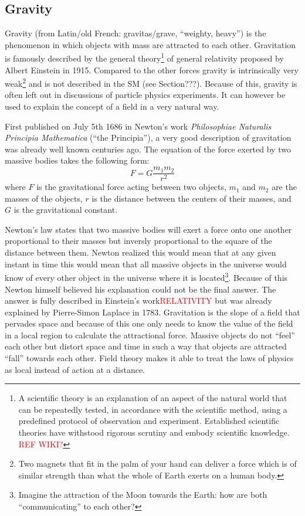 \subsection*{Gravity}
Gravity (from Latin/old French: gravitas/grave, ``weighty, heavy'') is the phenomenon in which objects with mass are attracted to each other. Gravitation is famously described by the general theory\footnote{A scientific theory is an explanation of an aspect of the natural world that can be repeatedly tested, in accordance with the scientific method, using a predefined protocol of observation and experiment. Established scientific theories have withstood rigorous scrutiny and embody scientific knowledge. \textcolor{red}{REF WIKI?}} of general relativity proposed by Albert Einstein in 1915. Compared to the other forces gravity is intrinsically very weak\footnote{Two magnets that fit in the palm of your hand can deliver a force which is of similar strength than what the whole of Earth exerts on a human body.} and is not described in the SM (see Section???). Because of this, gravity is often left out in discussions of particle physics experiments. It can however be used to explain the concept of a field in a very natural way.

First published on July 5th 1686 in Newton's work \textit{Philosophiae Naturalis Principia Mathematica} (``the Principia''), a very good description of gravitation was already well known centuries ago. The equation of the force exerted by two massive bodies takes the following form:
\begin{equation}
F = G \frac{m_1 m_2}{r^2}
\end{equation}
where $F$ is the gravitational force acting between two objects, $m_1$ and $m_2$ are the masses of the objects, $r$ is the distance between the centers of their masses, and $G$ is the gravitational constant.

Newton's law states that two massive bodies will exert a force onto one another proportional to their masses but inversly proportional to the square of the distance between them. Newton realized this would mean that at any given instant in time this would mean that all massive objects in the universe would know of every other object in the universe where it is located\footnote{Imagine the attraction of the Moon towards the Earth: how are both ``communicating'' to each other?}. Because of this Newton himself believed his explanation could not be the final answer. The answer is fully described in Einstein's work\textcolor{red}{RELATIVITY} but was already explained by Pierre-Simon Laplace in 1783. Gravitation is the slope of a field that pervades space and because of this one only needs to know the value of the field in a local region to calculate the attractional force.
Massive objects do not ``feel'' each other but distort space and time in such a way that objects are attracted ``fall'' towards each other. Field theory makes it able to treat the laws of physics as local instead of action at a distance.


